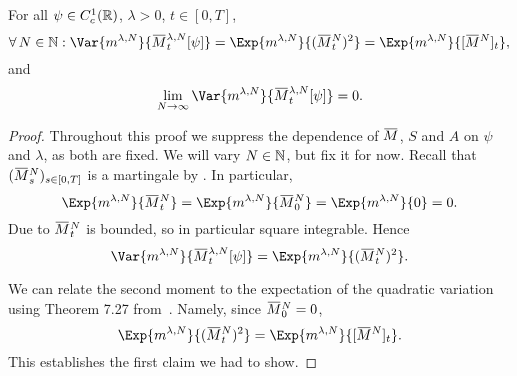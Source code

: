 \begin{proposition}\label{prop:vanishing-variance}
  For all \(\psi \in C_c^1(\mathbb{R})\), \(\lambda > 0\), \(t \in [0,T]\),
  \begin{equation}
    \forall N \in \bN : \Var{\lawmu^{\lambda,N}}{\ol{M}_t^{\lambda,N}[\psi]} = \Exp{\lawmu^{\lambda,N}}{(\ol{M}_t^N)^2} = \Exp{\lawmu^{\lambda,N}}{\sbr{\ol{M}^N}_t},
  \end{equation}
  and
  \begin{equation}
    \lim_{N\to\infty} \Var{\lawmu^{\lambda,N}}{\ol{M}_t^{\lambda,N}[\psi]} = 0.
  \end{equation}
\end{proposition}
\begin{proof}
  Throughout this proof we suppress the dependence of \( \ol{M} \), \( S \) and \( A \) on \( \psi \) and \( \lambda \), as both are fixed.
  We will vary \( N \in \mathbb{N} \), but fix it for now.
  Recall that \((\ol{M}_s^N)_{s\in[0,T]}\) is a martingale by .
  In particular,
  \begin{equation}
    \Exp{\lawmu^{\lambda,N}}{\ol{M}_t^N} = \Exp{\lawmu^{\lambda,N}}{\ol{M}_0^N}
    = \Exp{\lawmu^{\lambda,N}}{0} = 0.    %
  \end{equation}
  Due to  \( \ol{M}_t^N \) is bounded, so in particular square integrable.
  Hence
  \begin{equation}
    \Var{\lawmu^{\lambda,N}}{\ol{M}_t^{\lambda,N}[\psi]} = \Exp{\lawmu^{\lambda,N}}{(\ol{M}_t^N)^2}.
  \end{equation}


  We can relate the second moment to the expectation of the quadratic variation using Theorem 7.27 from~\cite[201]{klebanerIntroductionStochasticCalculus2012}.
  Namely, since \(\ol{M}_0^N = 0\),
  \begin{equation}
    \Exp{\lawmu^{\lambda,N}}{(\ol{M}_t^N)^2} = \Exp{\lawmu^{\lambda,N}}{\sbr{\ol{M}^N}_t}.
  \end{equation}
  This establishes the first claim we had to show.


\end{proof}
